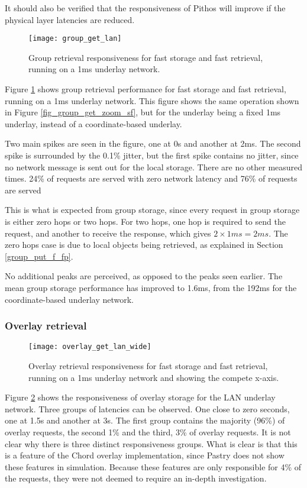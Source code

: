 It should also be verified that the responsiveness of Pithos will improve if the physical layer latencies are reduced.

\begin{figure}[htbp]
 \centering
 \texttt{[image: group\_get\_lan]}
 \caption{Group retrieval responsiveness for fast storage and fast retrieval, running on a 1ms underlay network.}
 \label{fig_group_get_lan}
\end{figure}
%
Figure \ref{fig_group_get_lan} shows group retrieval performance for fast storage and fast retrieval, running on a 1ms underlay network. This figure shows the same operation shown in Figure \ref{fig_group_get_zoom_sf}, but for the underlay being a fixed 1ms underlay, instead of a coordinate-based underlay.

Two main spikes are seen in the figure, one at 0s and another at 2ms. The second spike is surrounded by the 0.1\% jitter, but the first spike contains no jitter, since no network message is sent out for the local storage. There are no other measured times. 24\% of requests are served with zero network latency and 76\% of requests are served

This is what is expected from group storage, since every request in group storage is either zero hops or two hops. For two hops, one hop is required to send the request, and another to receive the response, which gives $2\times 1 ms = 2 ms$. The zero hops case is due to local objects being retrieved, as explained in Section \ref{group_put_f_fp}.

No additional peaks are perceived, as opposed to the peaks seen earlier. The mean group storage performance has improved to 1.6ms, from the 192ms for the coordinate-based underlay network.

\subsubsection{Overlay retrieval}

\begin{figure}[htbp]
 \centering
 \texttt{[image: overlay\_get\_lan\_wide]}
 \caption{Overlay retrieval responsiveness for fast storage and fast retrieval, running on a 1ms underlay network and showing the compete x-axis.}
 \label{fig_overlay_get_lan_wide}
\end{figure}
%
Figure \ref{fig_overlay_get_lan_wide} shows the responsiveness of overlay storage for the LAN underlay network. Three groups of latencies can be observed. One close to zero seconds, one at 1.5s and another at 3s. The first group contains the majority (96\%) of overlay requests, the second 1\% and the third, 3\% of overlay requests. It  is not clear why there is three distinct responsiveness groups. What is clear is that this is a feature of the Chord overlay implementation, since Pastry does not show these features in simulation. Because these features are only responsible for 4\% of the requests, they were not deemed to require an in-depth investigation.

